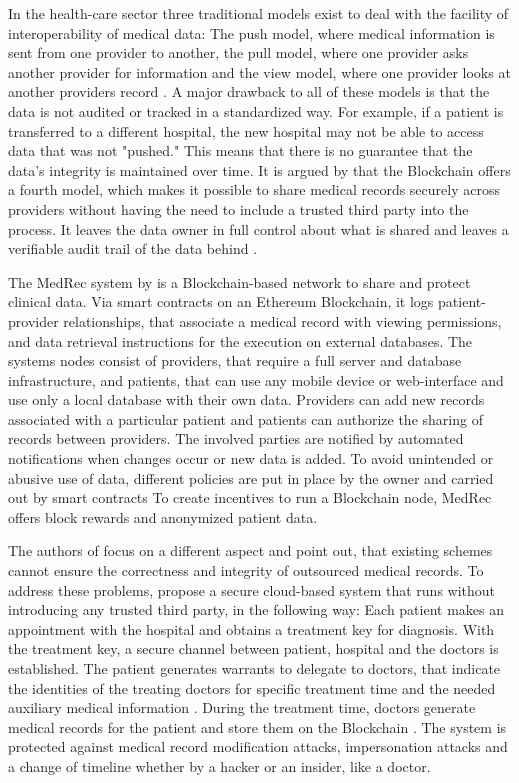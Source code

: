 In the health-care sector three traditional models exist to deal with the facility of interoperability of medical data: The push model, where medical information is sent from one provider to another, the pull model, where one provider asks another provider for information and the view model, where one provider looks at another providers record \cite{Kshetri2017}.
A major drawback to all of these models is that the data is not audited or tracked in a standardized way. For example, if a patient is transferred to a different hospital, the new hospital may not be able to access data that was not "pushed." This means that there is no guarantee that the data's integrity is maintained over time.
It is argued by \cite{Kshetri2017} that the Blockchain offers a fourth model, which makes it possible to share medical records securely across providers without having the need to include a trusted third party into the process. It leaves the data owner in full control about what is shared and leaves a verifiable audit trail of the data behind \cite{Kshetri2017}.

The MedRec system by \cite{Azaria2016} is a Blockchain-based network to share and protect clinical data. Via smart contracts on an Ethereum Blockchain, it logs patient-provider relationships, that associate a medical record with viewing permissions, and data retrieval instructions for the execution on external databases.
The systems nodes consist of providers, that require a full server and database infrastructure, and patients, that can use any mobile device or web-interface and use only a local database with their own data.
Providers can add new records associated with a particular patient and patients can authorize the sharing of records between providers. The involved parties are notified by automated notifications when changes occur or new data is added. To avoid unintended or abusive use of data, different policies are put in place by the owner and carried out by smart contracts
To create incentives to run a Blockchain node, MedRec offers block rewards and anonymized patient data.

The authors of\cite{Cao2019} focus on a different aspect and point out, that existing schemes cannot ensure the correctness and integrity of outsourced medical records. 
To address these problems, \cite{Cao2019} propose a secure cloud-based system that runs without introducing any trusted third party, in the following way:
 Each patient makes an appointment with the hospital and obtains a treatment key for diagnosis. With the treatment key, a secure channel between patient, hospital and the doctors is established. 
The patient generates warrants to delegate to doctors, that indicate the identities of the treating doctors for specific treatment time and the needed auxiliary medical information \cite{Cao2019}.
During the treatment time, doctors generate medical records for the patient and store them on the Blockchain \cite{Cao2019}.
The system is protected against medical record modification attacks, impersonation attacks and a change of timeline whether by a hacker or an insider, like a doctor.

